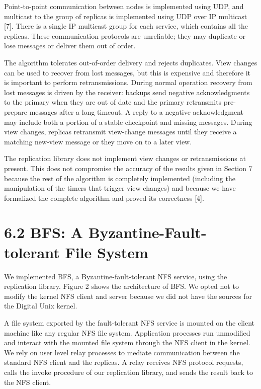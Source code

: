 \documentclass[
]{article}
\begin{document}
Point-to-point communication between nodes is implemented using UDP, and
multicast to the group of replicas is implemented using UDP over IP
multicast {[}7{]}. There is a single IP multicast group for each
service, which contains all the replicas. These communication protocols
are unreliable; they may duplicate or lose messages or deliver them out
of order.

The algorithm tolerates out-of-order delivery and rejects duplicates.
View changes can be used to recover from lost messages, but this is
expensive and therefore it is important to perform retransmissions.
During normal operation recovery from lost messages is driven by the
receiver: backups send negative acknowledgments to the primary when they
are out of date and the primary retransmits pre-prepare messages after a
long timeout. A reply to a negative acknowledgment may include both a
portion of a stable checkpoint and missing messages. During view
changes, replicas retransmit view-change messages until they receive a
matching new-view message or they move on to a later view.

The replication library does not implement view changes or
retransmissions at present. This does not compromise the accuracy of the
results given in Section 7 because the rest of the algorithm is
completely implemented (including the manipulation of the timers that
trigger view changes) and because we have formalized the complete
algorithm and proved its correctness {[}4{]}.

\section{6.2 BFS: A Byzantine-Fault-tolerant File
System}\label{bfs-a-byzantine-fault-tolerant-file-system}

We implemented BFS, a Byzantine-fault-tolerant NFS service, using the
replication library. Figure 2 shows the architecture of BFS. We opted
not to modify the kernel NFS client and server because we did not have
the sources for the Digital Unix kernel.

A file system exported by the fault-tolerant NFS service is mounted on
the client machine like any regular NFS file system. Application
processes run unmodified and interact with the mounted file system
through the NFS client in the kernel. We rely on user level relay
processes to mediate communication between the standard NFS client and
the replicas. A relay receives NFS protocol requests, calls the invoke
procedure of our replication library, and sends the result back to the
NFS client.
\end{document}
